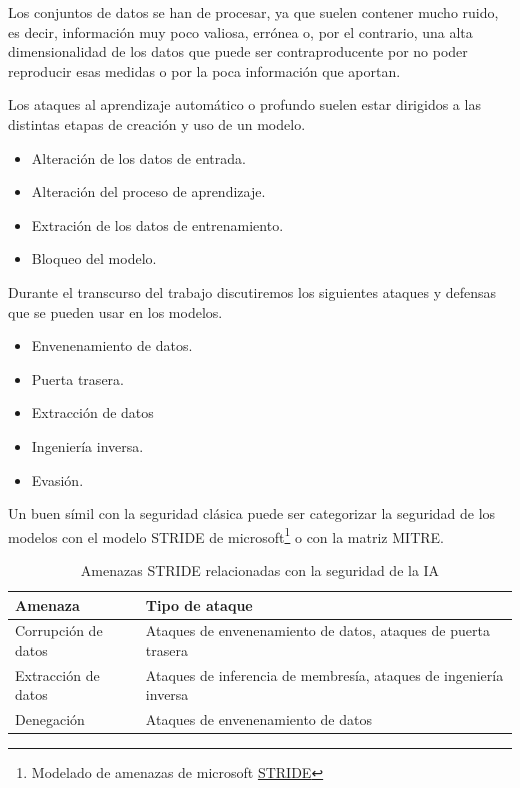Los conjuntos de datos se han de procesar, ya que suelen contener mucho ruido, es decir, información muy poco valiosa, errónea o, por el contrario, una alta dimensionalidad de los datos que puede ser contraproducente por no poder reproducir esas medidas o por la poca información que aportan.

Los ataques al aprendizaje automático o profundo suelen estar dirigidos a las distintas etapas de creación y uso de un modelo.

\begin{itemize}
  \item Alteración de los datos de entrada.
  \item Alteración del proceso de aprendizaje.
  \item Extración de los datos de entrenamiento.
  \item Bloqueo del modelo.
\end{itemize}

Durante el transcurso del trabajo discutiremos los siguientes ataques y defensas que se pueden usar en los modelos.

\begin{itemize}
  \item Envenenamiento de datos.
  \item Puerta trasera.
  \item Extracción de datos
  \item Ingeniería inversa.
  \item Evasión.
\end{itemize}

Un buen símil con la seguridad clásica puede ser categorizar la seguridad de los modelos con el modelo \gls{STRIDE} de microsoft\footnote{Modelado de amenazas de microsoft \href{https://learn.microsoft.com/es-es/azure/security/develop/threat-modeling-tool-threats}{STRIDE}} o con la matriz \gls{MITRE}.

\begin{table}[ht!]
  \centering
  \small
  \def\arraystretch{1.5}
  \begin{tabular}{lp{10cm}}
    \toprule
    \textbf{Amenaza}    & \textbf{Tipo de ataque}                                           \\
    \midrule
    Corrupción de datos & Ataques de envenenamiento de datos, ataques de puerta trasera     \\
    Extracción de datos & Ataques de inferencia de membresía, ataques de ingeniería inversa \\
    Denegación          & Ataques de envenenamiento de datos                                \\
    \bottomrule
  \end{tabular}
  \caption{Amenazas STRIDE relacionadas con la seguridad de la IA}
  \label{tab.amenazas}
\end{table}